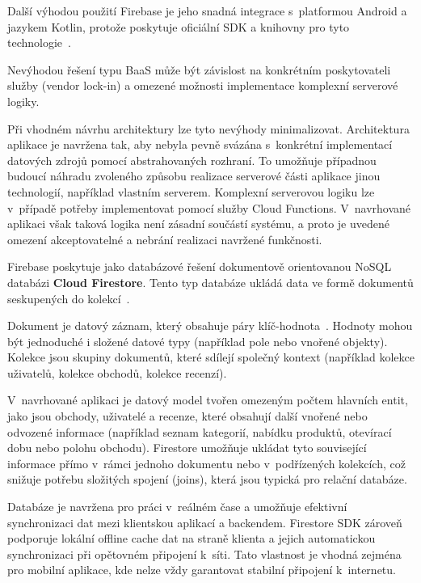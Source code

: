 Další výhodou použití Firebase je jeho snadná integrace s~platformou Android a jazykem Kotlin, protože poskytuje oficiální SDK a knihovny pro tyto technologie~\parencite{firebase_android_kotlin_support}.

Nevýhodou řešení typu BaaS může být závislost na konkrétním poskytovateli služby (vendor lock-in) a omezené možnosti implementace komplexní serverové logiky.

Při vhodném návrhu architektury lze tyto nevýhody minimalizovat.
Architektura aplikace je navržena tak, aby nebyla pevně svázána s~konkrétní implementací datových zdrojů pomocí abstrahovaných rozhraní.
To umožňuje případnou budoucí náhradu zvoleného způsobu realizace serverové části aplikace jinou technologií, například vlastním serverem.
Komplexní serverovou logiku lze v~případě potřeby implementovat pomocí služby Cloud Functions.
V~navrhované aplikaci však taková logika není zásadní součástí systému, a proto je uvedené omezení akceptovatelné a nebrání realizaci navržené funkčnosti.

Firebase poskytuje jako databázové řešení dokumentově orientovanou NoSQL databázi \textbf{Cloud Firestore}.
Tento typ databáze ukládá data ve formě dokumentů seskupených do kolekcí~\parencite{firestore_overview}.

Dokument je datový záznam, který obsahuje páry klíč-hodnota~\parencite{firestore_data_model}.
Hodnoty mohou být jednoduché i složené datové typy (například pole nebo vnořené objekty).
Kolekce jsou skupiny dokumentů, které sdílejí společný kontext (například kolekce uživatelů, kolekce obchodů, kolekce recenzí).

V~navrhované aplikaci je datový model tvořen omezeným počtem hlavních entit, jako jsou obchody, uživatelé a recenze, které obsahují další vnořené nebo odvozené informace (například seznam kategorií, nabídku produktů, otevírací dobu nebo polohu obchodu).
Firestore umožňuje ukládat tyto související informace přímo v~rámci jednoho dokumentu nebo v~podřízených kolekcích, což snižuje potřebu složitých spojení (joins), která jsou typická pro relační databáze.

Databáze je navržena pro práci v~reálném čase a umožňuje efektivní synchronizaci dat mezi klientskou aplikací a backendem.
Firestore SDK zároveň podporuje lokální offline cache dat na straně klienta a jejich automatickou synchronizaci při opětovném připojení k~síti.
Tato vlastnost je vhodná zejména pro mobilní aplikace, kde nelze vždy garantovat stabilní připojení k~internetu.


